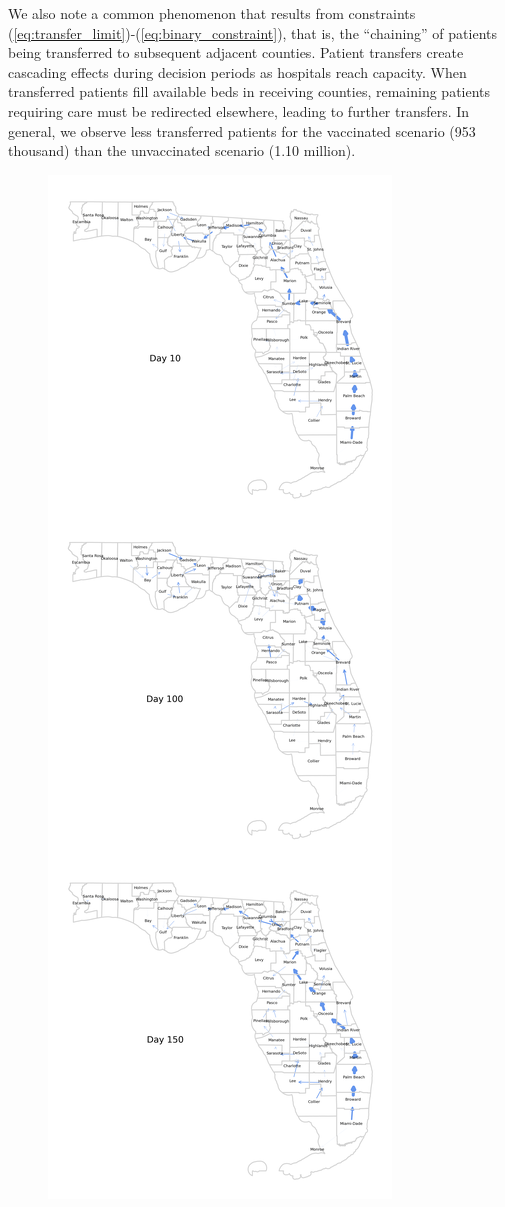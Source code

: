 \documentclass{article}
\begin{document}
We also note a common phenomenon that results from constraints (\ref{eq:transfer_limit})-(\ref{eq:binary_constraint}), that is, the ``chaining'' of patients being transferred to subsequent adjacent counties. Patient transfers create cascading effects during decision periods as hospitals reach capacity. When transferred patients fill available beds in receiving counties, remaining patients requiring care must be redirected elsewhere, leading to further transfers. In general, we observe less transferred patients for the vaccinated scenario (953 thousand) than the unvaccinated scenario (1.10 million).

\begin{figure}
    \centering
    \includegraphics[width=0.43\linewidth]{pics/paperStackedPatientTransfersVax0.1.png}

\end{figure}
\end{document}

